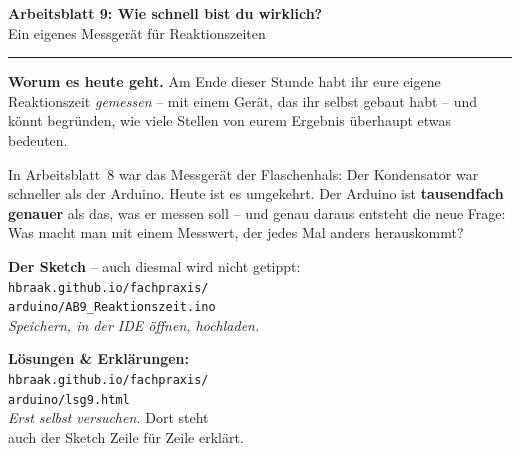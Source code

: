 \documentclass[a4paper,12pt]{scrartcl}
\begin{document}
\begin{center}
{\Large\textbf{Arbeitsblatt 9: Wie schnell bist du wirklich?}}\\[4pt]
\normalsize Ein eigenes Messgerät für Reaktionszeiten
\end{center}

\vspace{2pt}
\hrule
\vspace{7pt}

\begin{auftrag}
\textbf{Worum es heute geht.} Am Ende dieser Stunde habt ihr eure eigene Reaktionszeit
\emph{gemessen} -- mit einem Gerät, das ihr selbst gebaut habt -- und könnt begründen, wie viele
Stellen von eurem Ergebnis überhaupt etwas bedeuten.

\smallskip
\noindent In Arbeitsblatt~8 war das Messgerät der Flaschenhals: Der Kondensator war schneller als
der Arduino. Heute ist es umgekehrt. Der Arduino ist \textbf{tausendfach genauer} als das, was er
messen soll -- und genau daraus entsteht die neue Frage: Was macht man mit einem Messwert, der
jedes Mal anders herauskommt?
\end{auftrag}

\vspace{5pt}

\begin{center}
\noindent
\begin{minipage}[c]{2.0cm}
\end{minipage}%
\hspace{5pt}%
\begin{minipage}[c]{5.9cm}
\raggedright\small\textbf{Der Sketch} -- auch diesmal wird nicht getippt:\\
\texttt{hbraak.github.io/fachpraxis/}\\
\texttt{arduino/AB9\_Reaktionszeit.ino}\\[2pt]
\emph{Speichern, in der IDE öffnen, hochladen.}
\end{minipage}%
\hspace{12pt}%
\begin{minipage}[c]{2.0cm}
\end{minipage}%
\hspace{5pt}%
\begin{minipage}[c]{5.9cm}
\raggedright\small\textbf{Lösungen \& Erklärungen:}\\
\texttt{hbraak.github.io/fachpraxis/}\\
\texttt{arduino/lsg9.html}\\[2pt]
\emph{Erst selbst versuchen.} Dort steht\\
auch der Sketch Zeile für Zeile erklärt.
\end{minipage}
\end{center}
\end{document}
